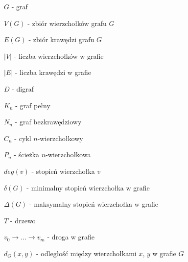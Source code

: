 $G$ - graf

$V(G)$ - zbiór wierzchołków grafu $G$

$E(G)$ - zbiór krawędzi grafu $G$

$|V|$ - liczba wierzchołków w grafie

$|E|$ - liczba krawędzi w grafie

$D$ - digraf

$K_n$ - graf pełny

$N_n$ - graf bezkrawędziowy

$C_n$ - cykl $n$-wierzchołkowy

$P_n$ - ścieżka $n$-wierzchołkowa

$deg(v)$ - stopień wierzchołka $v$

$\delta(G)$ - minimalny stopień wierzchołka w grafie
 
$\Delta(G)$ - maksymalny stopień wierzchołka w grafie

$T$ - drzewo

$v_0 \rightarrow ... \rightarrow v_m$ - droga w grafie

$d_G(x,y)$ - odległość między wierzchołkami $x$, $y$ w grafie $G$